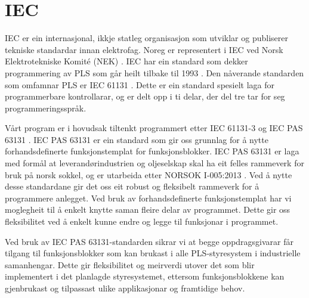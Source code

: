 \section{IEC}
\thispagestyle{fancy}
\label{sec:5.2}


\gls{IEC} \citep{IEC} er ein internasjonal, ikkje statleg organisasjon som utviklar og publiserer tekniske standardar innan elektrofag. 
Noreg er representert i \gls{IEC} ved Norsk Elektrotekniske Komité (\gls{NEK}) \citep{IEC-SNL}. 
\gls{IEC} har ein standard som dekker programmering av \gls{PLS} som går heilt tilbake til 1993 \citep{Wiki-93}. 
Den nåverande standarden som omfamnar PLS er IEC 61131 \citep{IEC-61131}. Dette er ein standard spesielt laga for programmerbare kontrollarar, og er delt opp i ti delar, der del tre tar for seg programmeringsspråk. 

Vårt program er i hovudsak tiltenkt programmert etter \gls{IEC} 61131-3 og \gls{IEC} \gls{PAS} 63131 \citep{IEC-63131}. 
\Gls{IEC} \gls{PAS} 63131 er ein standard som gir oss grunnlag for å nytte forhandsdefinerte funksjonstemplat for funksjonsblokker. 
\gls{IEC} \gls{PAS} 63131 er laga med formål at leverandørindustrien og oljeselskap skal ha eit felles rammeverk for bruk på norsk sokkel, og er utarbeida etter NORSOK I-005:2013 \citep{NORSOK}.
Ved å nytte desse standardane gir det oss eit robust og fleksibelt rammeverk for å programmere anlegget. 
Ved bruk av forhandsdefinerte funksjonstemplat har vi moglegheit til å enkelt knytte saman fleire delar av programmet. 
Dette gir oss fleksibilitet ved å enkelt kunne endre og legge til funksjonar i programmet.

Ved bruk av \gls{IEC} \gls{PAS} 63131-standarden sikrar vi at begge oppdragsgivarar får tilgang til funksjonsblokker 
som kan brukast i alle \gls{PLS}-styresystem i industrielle samanhengar. Dette gir fleksibilitet 
og meirverdi utover det som blir implementert i det planlagde styresystemet, 
ettersom funksjonsblokkene kan gjenbrukast og tilpassast ulike applikasjonar og framtidige behov.
\newpage

